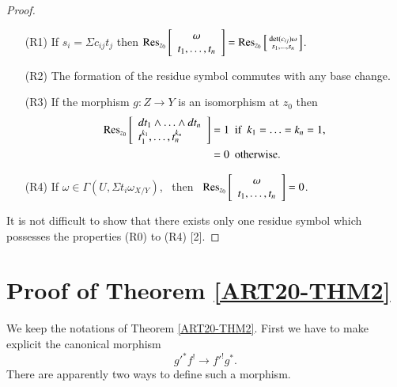 \begin{proof}
\begin{itemize}
\item[(R1)] If $s_{i}=\Sigma c_{ij}t_{j}$ then $\operatorname{\mathrm{Res}}_{z_{0}}\left[\begin{array}{c} \omega\\ t_{1},\ldots,t_{n}
\end{array}\right]=\operatorname{\mathrm{Res}}_{z_{0}}\left[\begin{smallmatrix} \det(c_{ij})\omega\\ s_{1},\ldots,s_{n}\end{smallmatrix}\right]$.

\item[(R2)] The formation of the residue symbol commutes with any base change.

\item[(R3)] If the morphism $g:Z\to Y$ is an isomorphism at $z_{0}$ then 
\begin{align*}
\operatorname{\mathrm{Res}}_{z_{0}}\left[\begin{array}{l} dt_{1}\wedge\ldots\wedge dt_{n}\\ t^{k_{1}}_{1},\ldots,t^{k_{n}}_{n}\end{array}\right] &= 1\text{~ if~ } k_{1}=\ldots=k_{n}=1,\\
&= 0\text{~ otherwise.}
\end{align*}

\item[(R4)] If $\omega\in \Gamma(U,\Sigma t_{i}\omega_{X/Y})$, \ then \ $\operatorname{\mathrm{Res}}_{z_{0}}\left[\begin{array}{c} \omega\\ t_{1},\ldots,t_{n}\end{array}\right]=0$.
\end{itemize}

It is not difficult to show that there exists only one residue symbol which possesses the properties (R0) to (R4) [2].
\end{proof}

\setcounter{section}{2}
\section{Proof of Theorem \ref{ART20-THM2}}\label{art20-sec3}

We keep the notations of Theorem \ref{ART20-THM2}. First we have to make explicit the canonical morphism
$$
{g'}^{*}f^{!}\to {f'}^{!}g^{*}.
$$
There are apparently two ways to define such a morphism.

